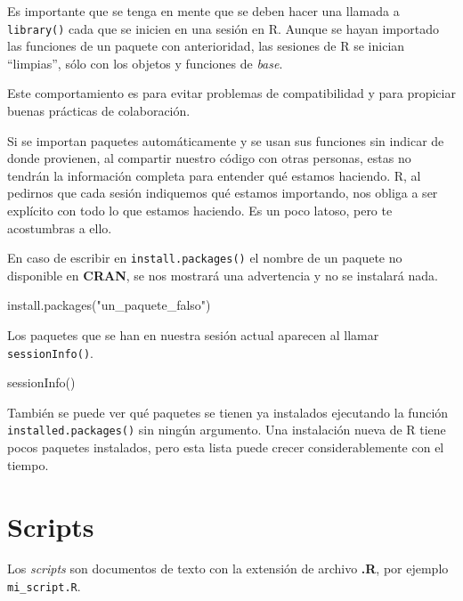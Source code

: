 \documentclass[
]{book}
\newenvironment{Shaded}{\begin{snugshade}}{\end{snugshade}}
\newcommand{\FunctionTok}[1]{\textcolor[rgb]{0.00,0.00,0.00}{#1}}
\newcommand{\NormalTok}[1]{#1}
\newcommand{\StringTok}[1]{\textcolor[rgb]{0.31,0.60,0.02}{#1}}
\begin{document}
Es importante que se tenga en mente que se deben hacer una llamada a \texttt{library()} cada que se inicien en una sesión en R. Aunque se hayan importado las funciones de un paquete con anterioridad, las sesiones de R se inician ``limpias'', sólo con los objetos y funciones de \emph{base}.

Este comportamiento es para evitar problemas de compatibilidad y para propiciar buenas prácticas de colaboración.

Si se importan paquetes automáticamente y se usan sus funciones sin indicar de donde provienen, al compartir nuestro código con otras personas, estas no tendrán la información completa para entender qué estamos haciendo. R, al pedirnos que cada sesión indiquemos qué estamos importando, nos obliga a ser explícito con todo lo que estamos haciendo. Es un poco latoso, pero te acostumbras a ello.

En caso de escribir en \texttt{install.packages()} el nombre de un paquete no disponible en \textbf{CRAN}, se nos mostrará una advertencia y no se instalará nada.

\begin{Shaded}
\begin{Highlighting}[]
\FunctionTok{install.packages}\NormalTok{(}\StringTok{"un\_paquete\_falso"}\NormalTok{)}
\end{Highlighting}
\end{Shaded}

Los paquetes que se han en nuestra sesión actual aparecen al llamar \texttt{sessionInfo()}.

\begin{Shaded}
\begin{Highlighting}[]
\FunctionTok{sessionInfo}\NormalTok{()}
\end{Highlighting}
\end{Shaded}

También se puede ver qué paquetes se tienen ya instalados ejecutando la función \texttt{installed.packages()} sin ningún argumento. Una instalación nueva de R tiene pocos paquetes instalados, pero esta lista puede crecer considerablemente con el tiempo.

\hypertarget{scripts}{%
\section{Scripts}\label{scripts}}

Los \emph{scripts} son documentos de texto con la extensión de archivo \textbf{.R}, por ejemplo \texttt{mi\_script.R}.
\end{document}
